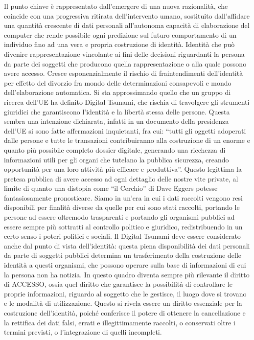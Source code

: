 Il punto chiave è rappresentato dall’emergere di una nuova razionalità, che coincide con una progressiva ritirata dell’intervento umano, sostituito dall’affidare una quantità crescente di dati personali all’autonoma capacità di elaborazione del computer che rende possibile ogni predizione sul futuro comportamento di un individuo fino ad una vera e propria costruzione di identità. Identità che può divenire rappresentazione vincolante ai fini delle decisioni riguardanti la persona da parte dei soggetti che producono quella rappresentazione o alla quale possono avere accesso. Cresce esponenzialmente il rischio di fraintendimenti dell’identità per effetto del divorzio fra mondo delle determinazioni consapevoli e mondo dell’elaborazione automatica. Si sta approssimando quello che un gruppo di ricerca dell’UE ha definito Digital Tsunami, che rischia di travolgere gli strumenti giuridici che garantiscono l’identità e la libertà stessa delle persone. Questa sembra una intenzione dichiarata, infatti in un documento della presidenza dell’UE si sono fatte affermazioni inquietanti, fra cui: “tutti gli oggetti adoperati dalle persone e tutte le transazioni contribuiranno alla costruzione di un enorme e quanto più possibile completo dossier digitale, generando una ricchezza di informazioni utili per gli organi che tutelano la pubblica sicurezza, creando opportunità per una loro attività più efficace e produttiva”.
Questo legittima la pretesa pubblica di avere accesso ad ogni dettaglio delle nostre vite private, al limite di quanto una distopia come “il Cerchio” di Dave Eggers potesse fantasiosamente pronosticare.
Siamo in un’era in cui i dati raccolti vengono resi disponibili per finalità diverse da quelle per cui sono stati raccolti, portando le persone ad essere oltremodo trasparenti e portando gli organismi pubblici ad essere sempre più sottratti al controllo politico e giuridico, redistribuendo in un certo senso i poteri politici e sociali.
Il Digital Tsunami deve essere considerato anche dal punto di vista dell’identità: questa piena disponibilità dei dati personali da parte di soggetti pubblici determina un trasferimento della costruzione delle identità a questi organismi, che possono operare sulla base di informazioni di cui la persona non ha notizia. In questo quadro diventa sempre più rilevante il diritto di ACCESSO, ossia quel diritto che garantisce la possibilità di controllare le proprie informazioni, riguardo al soggetto che le gestisce, il luogo dove si trovano e le modalità di utilizzazione. Questo si rivela essere un diritto essenziale per la costruzione dell’identità, poiché conferisce il potere di ottenere la cancellazione e la rettifica dei dati falsi, errati e illegittimamente raccolti, o conservati oltre i termini previsti, o l’integrazione di quelli incompleti.

